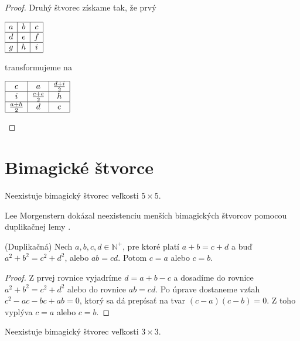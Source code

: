\begin{proof}
Druhý štvorec získame tak, že prvý

\begin{center}
$\begin{array}{ |c|c|c| } 
\hline
a & b & c \\ 
\hline
d & e & f \\ 
\hline
g & h & i \\
\hline
\end{array}$
\end{center}

transformujeme na

\begin{center}
$\begin{array}{ |c|c|c| } 
\hline
c & a & \frac{d+i}{2} \\ 
\hline
i & \frac{c+e}{2} & h \\ 
\hline
\frac{a+h}{2} & d & e \\
\hline
\end{array}$
\end{center}

\end{proof}

\section{Bimagické štvorce}

\begin{hypothesis} Neexistuje bimagický štvorec veľkosti $5 \times 5$.
\end{hypothesis}

Lee Morgenstern dokázal neexistenciu menších bimagických štvorcov pomocou duplikačnej lemy \cite{multimagie}.

\begin{lemma} (Duplikačná) Nech $a,b,c,d \in \mathbb{N^+}$, pre ktoré platí $a + b = c + d$ a buď $a^2 + b^2 = c^2 + d^2$, alebo $ab = cd$. Potom $c = a$ alebo $c = b$.
\end{lemma}
 
\begin{proof} Z prvej rovnice vyjadríme $d = a + b - c$ a dosadíme do rovnice $a^2 + b^2 = c^2 + d^2$ alebo do rovnice $ab = cd$. Po úprave dostaneme vzťah $c^2 - ac - bc + ab = 0$, ktorý sa dá prepísať na tvar $(c - a)(c - b) = 0$. Z toho vyplýva $c = a$ alebo $c = b$.
\end{proof} 


\begin{theorem} Neexistuje bimagický štvorec veľkosti $3 \times 3$.
\end{theorem}

